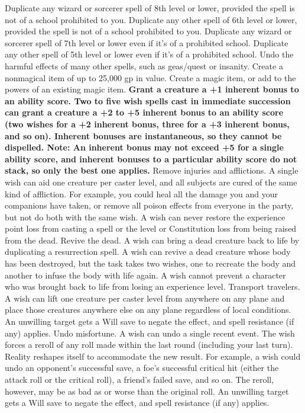 {Duplicate any wizard or sorcerer spell of 8th level or lower, provided the spell is not of a school prohibited to you.
Duplicate any other spell of 6th level or lower, provided the spell is not of a school prohibited to you.
Duplicate any wizard or sorcerer spell of 7th level or lower even if it's of a prohibited school.
Duplicate any other spell of 5th level or lower even if it's of a prohibited school.
Undo the harmful effects of many other spells, such as geas/quest or insanity.
Create a nonmagical item of up to 25,000 gp in value.
Create a magic item, or add to the powers of an existing magic item.
	\textbf{Grant a creature a +1 inherent bonus to an ability score. Two to five wish spells cast in immediate succession can grant a creature a +2 to +5 inherent bonus to an ability score (two wishes for a +2 inherent bonus, three for a +3 inherent bonus, and so on). Inherent bonuses are instantaneous, so they cannot be dispelled. Note: An inherent bonus may not exceed +5 for a single ability score, and inherent bonuses to a particular ability score do not stack, so only the best one applies.}
Remove injuries and afflictions. A single wish can aid one creature per caster level, and all subjects are cured of the same kind of affliction. For example, you could heal all the damage you and your companions have taken, or remove all poison effects from everyone in the party, but not do both with the same wish. A wish can never restore the experience point loss from casting a spell or the level or Constitution loss from being raised from the dead.
Revive the dead. A wish can bring a dead creature back to life by duplicating a resurrection spell. A wish can revive a dead creature whose body has been destroyed, but the task takes two wishes, one to recreate the body and another to infuse the body with life again. A wish cannot prevent a character who was brought back to life from losing an experience level.
Transport travelers. A wish can lift one creature per caster level from anywhere on any plane and place those creatures anywhere else on any plane regardless of local conditions. An unwilling target gets a Will save to negate the effect, and spell resistance (if any) applies.
Undo misfortune. A wish can undo a single recent event. The wish forces a reroll of any roll made within the last round (including your last turn). Reality reshapes itself to accommodate the new result. For example, a wish could undo an opponent's successful save, a foe's successful critical hit (either the attack roll or the critical roll), a friend's failed save, and so on. The reroll, however, may be as bad as or worse than the original roll. An unwilling target gets a Will save to negate the effect, and spell resistance (if any) applies.

}
